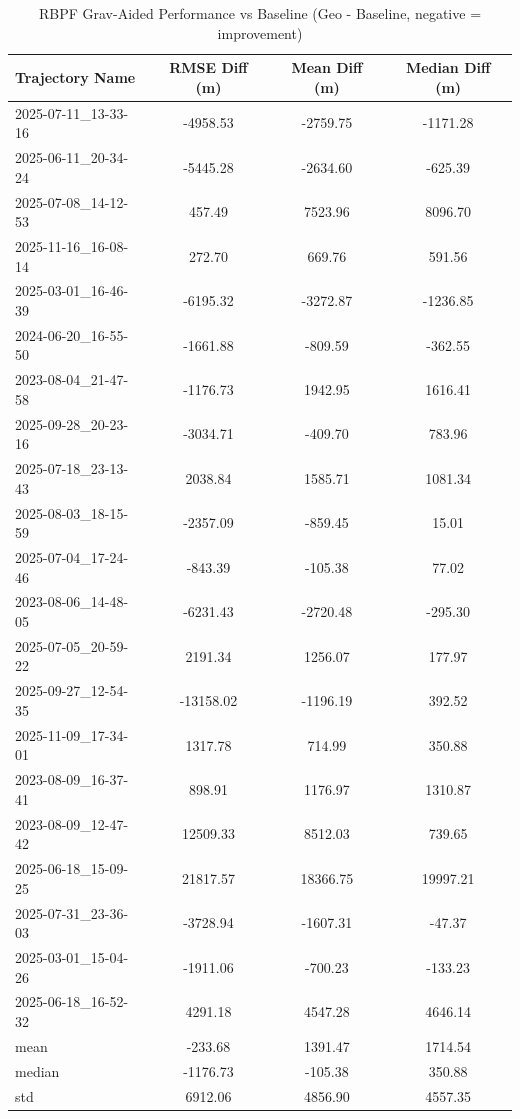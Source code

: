 \begin{table}[h]
    \centering
    \caption{RBPF Grav-Aided Performance vs Baseline (Geo - Baseline, negative = improvement)}
    \begin{tabular}{ || l || c c c || }
    \toprule
    Trajectory Name & RMSE Diff (m) & Mean Diff (m) & Median Diff (m) \\
    \midrule
    2025-07-11\_13-33-16 & -4958.53 & -2759.75 & -1171.28 \\
    2025-06-11\_20-34-24 & -5445.28 & -2634.60 & -625.39 \\
    2025-07-08\_14-12-53 & 457.49 & 7523.96 & 8096.70 \\
    2025-11-16\_16-08-14 & 272.70 & 669.76 & 591.56 \\
    2025-03-01\_16-46-39 & -6195.32 & -3272.87 & -1236.85 \\
    2024-06-20\_16-55-50 & -1661.88 & -809.59 & -362.55 \\
    2023-08-04\_21-47-58 & -1176.73 & 1942.95 & 1616.41 \\
    2025-09-28\_20-23-16 & -3034.71 & -409.70 & 783.96 \\
    2025-07-18\_23-13-43 & 2038.84 & 1585.71 & 1081.34 \\
    2025-08-03\_18-15-59 & -2357.09 & -859.45 & 15.01 \\
    2025-07-04\_17-24-46 & -843.39 & -105.38 & 77.02 \\
    2023-08-06\_14-48-05 & -6231.43 & -2720.48 & -295.30 \\
    2025-07-05\_20-59-22 & 2191.34 & 1256.07 & 177.97 \\
    2025-09-27\_12-54-35 & -13158.02 & -1196.19 & 392.52 \\
    2025-11-09\_17-34-01 & 1317.78 & 714.99 & 350.88 \\
    2023-08-09\_16-37-41 & 898.91 & 1176.97 & 1310.87 \\
    2023-08-09\_12-47-42 & 12509.33 & 8512.03 & 739.65 \\
    2025-06-18\_15-09-25 & 21817.57 & 18366.75 & 19997.21 \\
    2025-07-31\_23-36-03 & -3728.94 & -1607.31 & -47.37 \\
    2025-03-01\_15-04-26 & -1911.06 & -700.23 & -133.23 \\
    2025-06-18\_16-52-32 & 4291.18 & 4547.28 & 4646.14 \\
    \midrule
    mean & -233.68 & 1391.47 & 1714.54 \\
    median & -1176.73 & -105.38 & 350.88 \\
    std & 6912.06 & 4856.90 & 4557.35 \\
    \bottomrule
    \end{tabular}
    \label{tab:rbpf_grav_results}
\end{table}